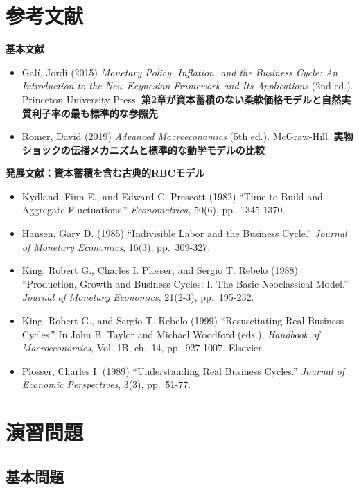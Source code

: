 \documentclass[
  japanese,
  lualatex,
  ja=standard,
  12pt,
  a4paper]{ltjsarticle}
\providecommand{\tightlist}{%
  \setlength{\itemsep}{0pt}\setlength{\parskip}{0pt}}
\begin{document}
\section{参考文献}\label{ux53c2ux8003ux6587ux732e}

\textbf{基本文献}

\begin{itemize}
\tightlist
\item
  Galí, Jordi (2015) \emph{Monetary Policy, Inflation, and the Business
  Cycle: An Introduction to the New Keynesian Framework and Its
  Applications} (2nd ed.). Princeton University Press.
  \textbf{第2章が資本蓄積のない柔軟価格モデルと自然実質利子率の最も標準的な参照先}
\item
  Romer, David (2019) \emph{Advanced Macroeconomics} (5th ed.).
  McGraw-Hill.
  \textbf{実物ショックの伝播メカニズムと標準的な動学モデルの比較}
\end{itemize}

\textbf{発展文献：資本蓄積を含む古典的RBCモデル}

\begin{itemize}
\tightlist
\item
  Kydland, Finn E., and Edward C. Prescott (1982) ``Time to Build and
  Aggregate Fluctuations.'' \emph{Econometrica}, 50(6), pp.~1345-1370.
\item
  Hansen, Gary D. (1985) ``Indivisible Labor and the Business Cycle.''
  \emph{Journal of Monetary Economics}, 16(3), pp.~309-327.
\item
  King, Robert G., Charles I. Plosser, and Sergio T. Rebelo (1988)
  ``Production, Growth and Business Cycles: I. The Basic Neoclassical
  Model.'' \emph{Journal of Monetary Economics}, 21(2-3), pp.~195-232.
\item
  King, Robert G., and Sergio T. Rebelo (1999) ``Resuscitating Real
  Business Cycles.'' In John B. Taylor and Michael Woodford (eds.),
  \emph{Handbook of Macroeconomics}, Vol. 1B, ch.~14, pp.~927-1007.
  Elsevier.
\item
  Plosser, Charles I. (1989) ``Understanding Real Business Cycles.''
  \emph{Journal of Economic Perspectives}, 3(3), pp.~51-77.
\end{itemize}

\section{演習問題}\label{ux6f14ux7fd2ux554fux984c}

\subsection{基本問題}\label{ux57faux672cux554fux984c}
\end{document}
